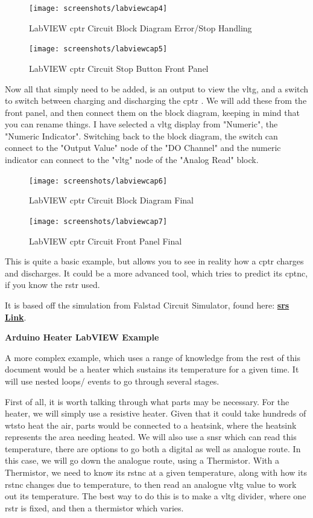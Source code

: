 \documentclass[a4paper,11pt]{report}
\let\oldhref\href %
\renewcommand{\href}[2]{\oldhref{#1}{\bf\gls{srs} #2}}
\begin{document}
\begin{figure}[H]
\centering
\texttt{[image: screenshots/labviewcap4]}
\caption{LabVIEW \gls{cptr} Circuit Block Diagram Error/Stop Handling}
\end{figure}

\begin{figure}[H]
\centering
\texttt{[image: screenshots/labviewcap5]}
\caption{LabVIEW \gls{cptr} Circuit Stop Button Front Panel}
\end{figure}

Now all that simply need to be added, is an output to view the \gls{vltg}, and a switch to switch between charging and discharging the \gls{cptr} . We will add these from the front panel, and then connect them on the block diagram, keeping in mind that you can rename things. I have selected a \gls{vltg} display from "Numeric", the "Numeric Indicator". Switching back to the block diagram, the switch can connect to the "Output Value" node of the "DO Channel" and the numeric indicator can connect to the "\gls{vltg}" node of the "Analog Read" block.

\begin{figure}[H]
\centering
\texttt{[image: screenshots/labviewcap6]}
\caption{LabVIEW \gls{cptr} Circuit Block Diagram Final}
\end{figure}

\begin{figure}[H]
\centering
\texttt{[image: screenshots/labviewcap7]}
\caption{LabVIEW \gls{cptr} Circuit Front Panel Final}
\end{figure}

This is quite a basic example, but allows you to see in reality how a \gls{cptr} charges and discharges. It could be a more advanced tool, which tries to predict its \gls{cptnc}, if you know the \gls{rstr} used.

It is based off the simulation from Falstad Circuit Simulator, found here: \href{https://tinyurl.com/2jjwc34l}{Link}.

\textbf{Arduino Heater LabVIEW Example}

A more complex example, which uses a range of knowledge from the rest of this document would be a heater which sustains its temperature for a given time. It will use nested loops/ events to go through several stages.

First of all, it is worth talking through what parts may be necessary. For the heater, we will simply use a resistive heater. Given that it could take hundreds of \gls{wt}sto heat the air, parts would be connected to a heatsink, where the heatsink represents the area needing heated. We will also use a \gls{snsr} which can read this temperature, there are options to go both a digital as well as analogue route. In this case, we will go down the analogue route, using a Thermistor. With a Thermistor, we need to know its \gls{rstnc} at a given temperature, along with how its \gls{rstnc} changes due to temperature, to then read an analogue \gls{vltg} value to work out its temperature. The best way to do this is to make a \gls{vltg} divider, where one \gls{rstr} is fixed, and then a thermistor which varies.
\end{document}
